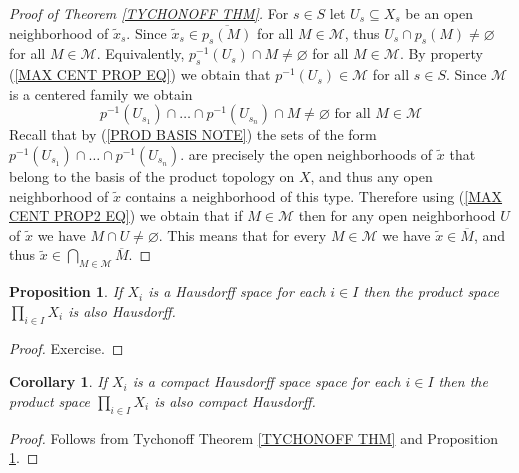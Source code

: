 \documentclass[11pt, letterpaper, oneside]{report}
\theoremstyle{pplain}
\newtheorem{proposition}[theorem]{Proposition}
\newtheorem{corollary}[theorem]{Corollary}
\newtheorem{ITERMVALUE THM}[theorem]{Intermediate Value Theorem}
\newtheorem{HEINEBOREL THM}[theorem]{Heine-Borel Theorem}
\newtheorem{UMETR THM}[theorem]{Urysohn Metrization Theorem}
\newtheorem{UMETR2 THM}[theorem]{Urysohn Metrization Theorem (v.2)}
\theoremstyle{ddefinition}
\theoremstyle{nnn}
\newtheorem{TDA NN}[theorem]{Topological Data Analysis. }
\theoremstyle{eexercise}
\newcommand{\MM}{{\mathcal M}}
\begin{document}
\begin{proof}[Proof of Theorem \ref{TYCHONOFF THM}]
For $s\in S$ let $U_{s}\subseteq X_{s}$ be an open neighborhood of $\tilde x_{s}$. Since
$\tilde x_{s}\in \overline{p_{s}(M)}$ for all $M\in \MM$, thus $U_{s}\cap p_{s}(M)\neq \varnothing$ for all $M\in \MM$.
Equivalently,  $p_{s}^{-1}(U_{s})\cap M \neq \varnothing $ for all $M\in \MM$. 
By property (\ref{MAX CENT PROP EQ})
we obtain that $p^{-1}(U_{s})\in \MM$ for all $s\in S$. Since $\MM$ is a centered family we obtain 
\begin{equation*}
\label{MAX CENT PROP2 EQ}
p^{-1}(U_{s_{1}})\cap \dots \cap p^{-1}(U_{s_{n}}) \cap M \neq \varnothing \text{\ \  for all } M\in \MM
\tag{$\ast\ast$}
\end{equation*}
Recall that by (\ref{PROD BASIS NOTE}) 
the sets of the form $p^{-1}(U_{s_{1}})\cap \dots \cap p^{-1}(U_{s_{n}})$. are precisely the open 
neighborhoods of $\tilde x$ that belong to the basis of the product topology on $X$, and thus 
any open neighborhood of $\tilde x$ contains a neighborhood of this type. Therefore 
using (\ref{MAX CENT PROP2 EQ}) we obtain that if $M\in \MM$ then for any open neighborhood 
$U$ of $\tilde x$ we have $M\cap U \neq \varnothing$. This means that for every $M\in \MM$ we have 
$\tilde x\in \overline{M}$, and thus $\tilde x\in \bigcap_{M\in \MM} \overline{M}$. 
 




\end{proof}


\begin{proposition}
\label{PROD HAUSDORFF PROP}
If $X_{i}$ is a Hausdorff  space for  each $i\in I$ then the product space $\prod_{i\in I}X_{i}$ is also Hausdorff. 
\end{proposition}

\begin{proof}
Exercise.
\end{proof}

\begin{corollary}
\label{PROD HAUS COMP COR}
If  $X_{i}$ is a compact Hausdorff space space for  each $i\in I$ then the product 
space $\prod_{i\in I}X_{i}$ is also compact Hausdorff. 
\end{corollary}

\begin{proof}
Follows from Tychonoff Theorem \ref{TYCHONOFF THM} and Proposition \ref{PROD HAUSDORFF PROP}.
\end{proof}
\end{document}
